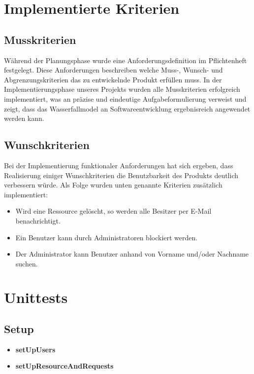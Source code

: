\documentclass[parskip=full,11pt]{scrartcl}
\begin{document}
\newpage
\section{Implementierte Kriterien}
\subsection{Musskriterien}
Während der Planungsphase wurde eine Anforderungsdefinition im Pflichtenheft festgelegt. Diese Anforderungen beschreiben welche Muss-, Wunsch- und Abgrenzungskriterien das zu entwickelnde Produkt erfüllen muss. In der Implementierungsphase unseres Projekts wurden alle Musskriterien erfolgreich implementiert, was an präzise und eindeutige Aufgabeformulierung verweist und zeigt, dass das Wasserfallmodel an Softwareentwicklung ergebnisreich angewendet werden kann.   

\subsection{Wunschkriterien}
Bei der Implementierung funktionaler Anforderungen hat sich ergeben, dass Realisierung einiger Wunschkriterien die Benutzbarkeit des Produkts deutlich verbessern würde. Als Folge wurden unten genannte Kriterien zusätzlich implementiert:
\begin{itemize}
\item Wird eine Ressource gelöscht, so werden alle Besitzer per E-Mail benachrichtigt.
\item Ein Benutzer kann durch Administratoren blockiert werden.
\item Der Administrator kann Benutzer anhand von Vorname und/oder Nachname suchen.
\end{itemize}


\newpage
\section*{Unittests}
\subsection*{Setup}
\begin{itemize}
\item \textbf{setUpUsers}
\item \textbf{setUpResourceAndRequests}
\end{itemize}
\end{document}
